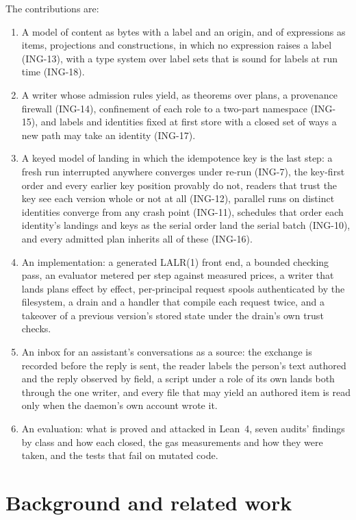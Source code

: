 \documentclass[11pt]{article}
\theoremstyle{plain}
\theoremstyle{definition}
\theoremstyle{remark}
\newcommand{\ing}[1]{ING-#1}
\begin{document}
The contributions are:
\begin{enumerate}
\item A model of content as bytes with a label and an origin, and of expressions as items,
  projections and constructions, in which no expression raises a label (\ing{13}), with a type
  system over label sets that is sound for labels at run time (\ing{18}).
\item A writer whose admission rules yield, as theorems over plans, a provenance firewall
  (\ing{14}), confinement of each role to a two-part namespace (\ing{15}), and labels and
  identities fixed at first store with a closed set of ways a new path may take an identity
  (\ing{17}).
\item A keyed model of landing in which the idempotence key is the last step: a fresh run
  interrupted anywhere converges under re-run (\ing{7}), the key-first order and every earlier
  key position provably do not, readers that trust the key see each version whole or not at all
  (\ing{12}), parallel runs on distinct identities converge from any crash point (\ing{11}),
  schedules that order each identity's landings and keys as the serial order land the serial
  batch (\ing{10}), and every admitted plan inherits all of these (\ing{16}).
\item An implementation: a generated LALR(1) front end, a bounded checking pass, an evaluator
  metered per step against measured prices, a writer that lands plans effect by effect,
  per-principal request spools authenticated by the filesystem, a drain and a handler that
  compile each request twice, and a takeover of a previous version's stored state under the
  drain's own trust checks.
\item An inbox for an assistant's conversations as a source: the exchange is recorded before the
  reply is sent, the reader labels the person's text authored and the reply observed by field,
  a script under a role of its own lands both through the one writer, and every file that may
  yield an authored item is read only when the daemon's own account wrote it.
\item An evaluation: what is proved and attacked in Lean~4, seven audits' findings by class and
  how each closed, the gas measurements and how they were taken, and the tests that fail on
  mutated code.
\end{enumerate}

\section{Background and related work}
\end{document}
